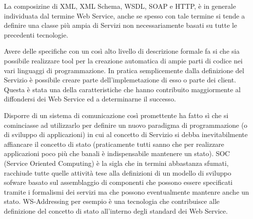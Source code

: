 La composizine di XML, XML Schema, WSDL, SOAP e HTTP, è in generale individuata
dal termine Web Service, anche se spesso con tale termine si tende a definire
una classe più ampia di Servizi non necessariamente basati su tutte le
precedenti tecnologie.

Avere delle specifiche con un così alto livello di descrizione formale fa si
che sia possibile realizzare tool per la creazione
automatica di ampie parti di codice nei vari linguaggi di programmazione. In
pratica semplicemente dalla definizione del Servizio è possibile creare parte
dell'implemetazione di esso o parte dei client. Questa è stata una della
caratteristiche che hanno contribuito maggiormente al diffondersi dei Web
Service ed a determinarne il successo.

Disporre di un sistema di comunicazione così promettente ha fatto sì che si
cominciasse ad utilizzarlo per definire un nuovo paradigma di programmazione (o di sviluppo di
applicazioni) in cui al concetto di Servizio si debba inevitabilmente affiancare
il concetto di stato (praticamente tutti sanno che per realizzare applicazioni
poco più che banali è indispensabile mantenere un stato). SOC (Service Oriented Computing) è
la sigla che in termini abbastanza sfumati, racchiude tutte quelle attività
tese alla definizioni di un modello di sviluppo sofware basato sul assemblaggio
di componenti che possono essere specificati tramite i formalismi
dei servizi ma che possono eventualmente mantenre anche un stato. WS-Addressing
per esempio è una tecnologia che contribuisce alle definizione del concetto di
stato all'interno degli standard dei Web Service. 



